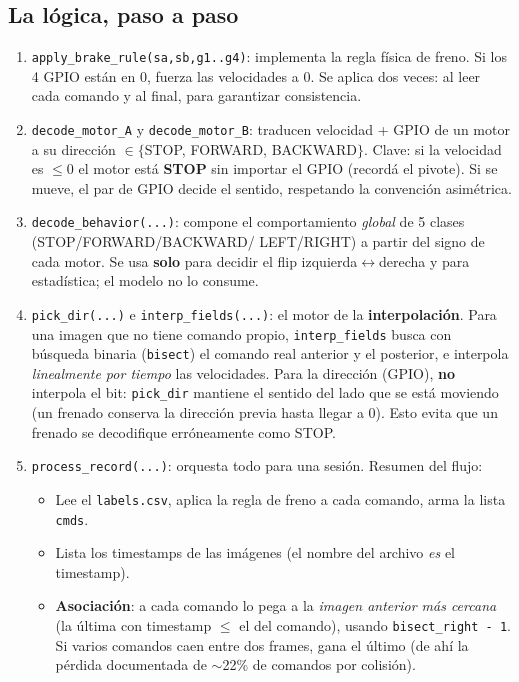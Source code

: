 \documentclass[11pt,a4paper]{article}
\newcommand{\code}[1]{\lstinline[basicstyle=\ttfamily\normalsize]|#1|}
\begin{document}
\subsection*{La lógica, paso a paso}
\begin{enumerate}
  \item \code{apply_brake_rule(sa,sb,g1..g4)}: implementa la regla física de freno. Si los 4 GPIO están en 0,
  fuerza las velocidades a 0. Se aplica dos veces: al leer cada comando y al final, para garantizar consistencia.
  \item \code{decode_motor_A} y \code{decode_motor_B}: traducen velocidad + GPIO de un motor a su dirección
  $\in\{$STOP, FORWARD, BACKWARD$\}$. Clave: si la velocidad es $\le 0$ el motor está \textbf{STOP} sin importar
  el GPIO (recordá el pivote). Si se mueve, el par de GPIO decide el sentido, respetando la convención asimétrica.
  \item \code{decode_behavior(...)}: compone el comportamiento \emph{global} de 5 clases (STOP/FORWARD/BACKWARD/
  LEFT/RIGHT) a partir del signo de cada motor. Se usa \textbf{solo} para decidir el flip izquierda$\leftrightarrow$derecha
  y para estadística; el modelo no lo consume.
  \item \code{pick_dir(...)} e \code{interp_fields(...)}: el motor de la \textbf{interpolación}. Para una imagen
  que no tiene comando propio, \code{interp_fields} busca con búsqueda binaria (\code{bisect}) el comando real
  anterior y el posterior, e interpola \emph{linealmente por tiempo} las velocidades. Para la dirección (GPIO),
  \textbf{no} interpola el bit: \code{pick_dir} mantiene el sentido del lado que se está moviendo (un frenado
  conserva la dirección previa hasta llegar a 0). Esto evita que un frenado se decodifique erróneamente como STOP.
  \item \code{process_record(...)}: orquesta todo para una sesión. Resumen del flujo:
  \begin{itemize}
    \item Lee el \code{labels.csv}, aplica la regla de freno a cada comando, arma la lista \code{cmds}.
    \item Lista los timestamps de las imágenes (el nombre del archivo \emph{es} el timestamp).
    \item \textbf{Asociación}: a cada comando lo pega a la \emph{imagen anterior más cercana} (la última con
    timestamp $\le$ el del comando), usando \code{bisect_right - 1}. Si varios comandos caen entre dos frames,
    gana el último (de ahí la pérdida documentada de $\sim$22\% de comandos por colisión).

\end{itemize}
\end{enumerate}
\end{document}
